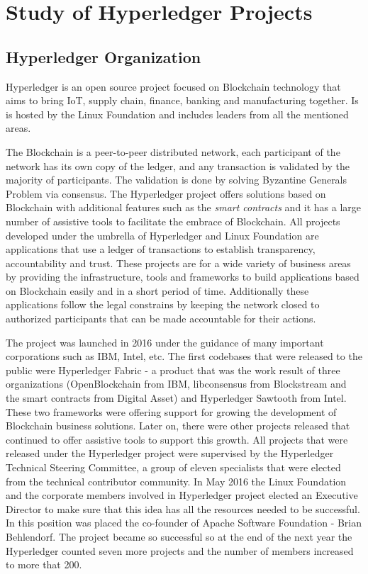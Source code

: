 \chapter{Study of Hyperledger Projects}
\label{chapter:chapter2}

\section{Hyperledger Organization}
\label{sec:chapter1-section1}
Hyperledger is an open source project focused on Blockchain technology that aims to bring IoT, supply chain, finance, banking and manufacturing together. Is is hosted by the Linux Foundation and includes leaders from all the mentioned areas.

The Blockchain is a peer-to-peer distributed network, each participant of the network has its own copy of the ledger, and any transaction is validated by the majority of participants. The validation is done by solving Byzantine Generals Problem via consensus.
The Hyperledger project offers solutions based on Blockchain with additional features such as the \emph{smart contracts} and it has a large number of assistive tools to facilitate the embrace of Blockchain.
All projects developed under the umbrella of Hyperledger and Linux Foundation are applications that use a ledger of transactions to establish transparency, accountability and trust. These projects are for a wide variety of business areas by providing the infrastructure, tools and frameworks to build applications based on Blockchain easily and in a short period of time. Additionally these applications follow the legal constrains by keeping the network closed to authorized participants that can be made accountable for their actions.

The project was launched in 2016 under the guidance of many important corporations such as IBM, Intel, etc. The first codebases that were released to the public were Hyperledger Fabric - a product that was the work result of three organizations (OpenBlockchain from IBM, libconsensus from Blockstream and the smart contracts from Digital Asset) and Hyperledger Sawtooth from Intel. 
These two frameworks were offering support for growing the development of Blockchain business solutions. Later on, there were other projects released that continued to offer assistive tools to support this growth. All projects that were released under the Hyperledger project were supervised by the Hyperledger Technical Steering Committee, a group of eleven specialists that were elected from the technical contributor community.
In May 2016 the Linux Foundation and the corporate members involved in Hyperledger project elected an Executive Director to make sure that this idea has all the resources needed to be successful. In this position was placed the co-founder of Apache Software Foundation - Brian Behlendorf. 
The project became so successful so at the end of the next year the Hyperledger counted seven more projects and the number of members increased to more that 200.

